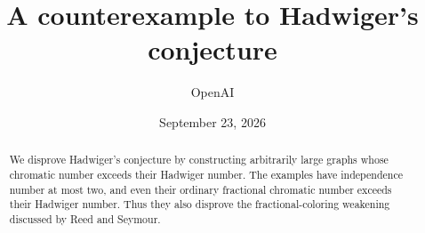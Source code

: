 \documentclass[11pt]{article}
\title{A counterexample to Hadwiger's conjecture}
\author{OpenAI}
\date{September 23, 2026}
\begin{document}
\maketitle
\begin{abstract}
We disprove Hadwiger's conjecture by constructing arbitrarily large
graphs whose chromatic number exceeds their Hadwiger number. The examples
have independence number at most two, and even their ordinary fractional
chromatic number exceeds their Hadwiger number. Thus they also disprove
the fractional-coloring weakening discussed by Reed and Seymour.
\end{abstract}
\begingroup
\small
\setlength{\parskip}{0pt}
\tableofcontents
\endgroup
\clearpage














\appendix

\clearpage
\setlength{\bibsep}{3pt plus 1pt minus 1pt}


\end{document}
